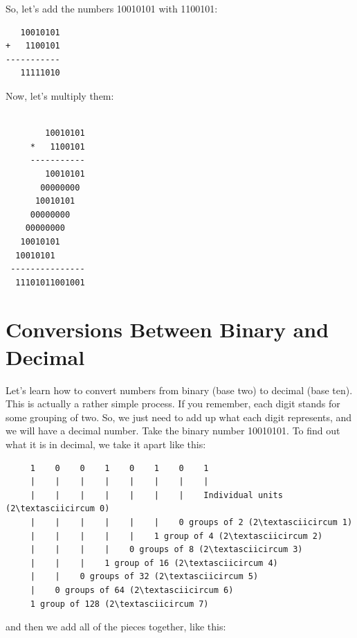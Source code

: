 So, let's add the numbers 10010101 with 1100101:

\begin{simpletyping}
\begin{lstlisting}
   10010101
+   1100101
-----------
   11111010
\end{lstlisting}
\end{simpletyping}

Now, let's multiply them:

\begin{simpletyping}
\begin{lstlisting}

        10010101
     *   1100101
     -----------
        10010101
       00000000
      10010101
     00000000
    00000000
   10010101
  10010101
 ---------------
  11101011001001
\end{lstlisting}
\end{simpletyping}

\section{Conversions Between Binary and Decimal}

Let's learn how to convert numbers from binary (base two) to 
decimal (base ten).  This is actually a rather simple process.
If you remember, each digit stands for some grouping of two.  So,
we just need to add up what each digit represents, and we will have
a decimal number.  Take the binary number 10010101.  To find out
what it is in decimal, we take it apart like this:

\begin{simpletyping}
\begin{lstlisting}
     1    0    0    1    0    1    0    1
     |    |    |    |    |    |    |    |
     |    |    |    |    |    |    |    Individual units (2\textasciicircum 0)
     |    |    |    |    |    |    0 groups of 2 (2\textasciicircum 1)
     |    |    |    |    |    1 group of 4 (2\textasciicircum 2)
     |    |    |    |    0 groups of 8 (2\textasciicircum 3)
     |    |    |    1 group of 16 (2\textasciicircum 4)
     |    |    0 groups of 32 (2\textasciicircum 5)
     |    0 groups of 64 (2\textasciicircum 6)
     1 group of 128 (2\textasciicircum 7)
\end{lstlisting}
\end{simpletyping}

and then we add all of the pieces together, like this:

